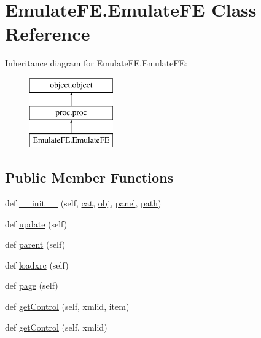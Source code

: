\hypertarget{classEmulateFE_1_1EmulateFE}{}\section{Emulate\+F\+E.\+Emulate\+FE Class Reference}
\label{classEmulateFE_1_1EmulateFE}
Inheritance diagram for Emulate\+F\+E.\+Emulate\+FE\+:\begin{figure}[H]
\begin{center}
\leavevmode
\includegraphics[height=3.000000cm]{classEmulateFE_1_1EmulateFE}
\end{center}
\end{figure}
\subsection*{Public Member Functions}
\begin{DoxyCompactItemize}
\item 
def \hyperlink{classEmulateFE_1_1EmulateFE_aa9871941190d71b8fa8e4b70ee66f9e4}{\+\_\+\+\_\+init\+\_\+\+\_\+} (self, \hyperlink{classobject_1_1object_af114388a80cca208c152ffeca0e89e23}{cat}, \hyperlink{classobject_1_1object_a82b61e7cd7e18b1f9de10fc832e5b75e}{obj}, \hyperlink{classproc_1_1proc_a36068ce6d978f4f4dde164e7bdc2e057}{panel}, \hyperlink{classobject_1_1object_a2a518f960961d791b0f900a90c3cd287}{path})
\item 
def \hyperlink{classEmulateFE_1_1EmulateFE_aefc7339cfc727ad13e3307761ff72795}{update} (self)
\item 
def \hyperlink{classproc_1_1proc_a997ae1c4cc88dfe9e361897bf471ca0f}{parent} (self)
\item 
def \hyperlink{classproc_1_1proc_a7acf16dcc37aaf46cc783a382ae6bd82}{loadxrc} (self)
\item 
def \hyperlink{classproc_1_1proc_a41bdd5dd3af283e3f0053c1a0c7fa7bf}{page} (self)
\item 
def \hyperlink{classobject_1_1object_a54a55487254a96ed2fe367439c41391f}{get\+Control} (self, xmlid, item)
\item 
def \hyperlink{classobject_1_1object_a22a9d1ff67cd6e990cf1b63ed49c50e4}{get\+Control} (self, xmlid)
\end{DoxyCompactItemize}

